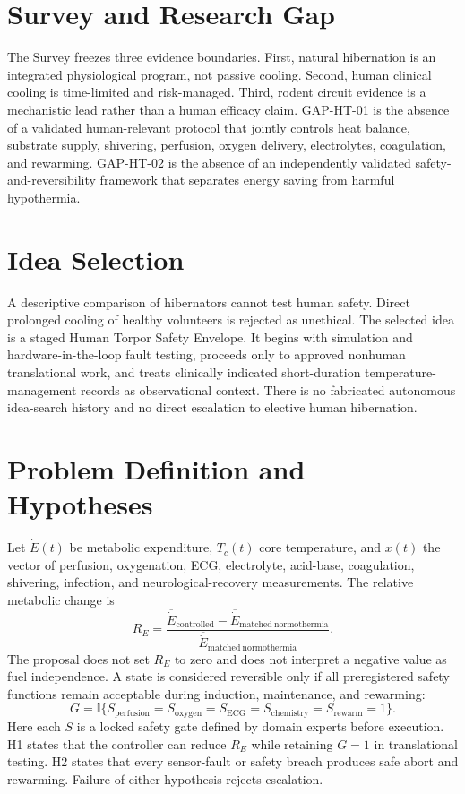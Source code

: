 \documentclass[conference]{IEEEtran}
\newcommand{\indicator}{\mathbb{I}}
\begin{document}
\section{Survey and Research Gap}
The Survey freezes three evidence boundaries. First, natural hibernation is an integrated physiological program, not passive cooling. Second, human clinical cooling is time-limited and risk-managed. Third, rodent circuit evidence is a mechanistic lead rather than a human efficacy claim. GAP-HT-01 is the absence of a validated human-relevant protocol that jointly controls heat balance, substrate supply, shivering, perfusion, oxygen delivery, electrolytes, coagulation, and rewarming. GAP-HT-02 is the absence of an independently validated safety-and-reversibility framework that separates energy saving from harmful hypothermia.
\section{Idea Selection}
A descriptive comparison of hibernators cannot test human safety. Direct prolonged cooling of healthy volunteers is rejected as unethical. The selected idea is a staged Human Torpor Safety Envelope. It begins with simulation and hardware-in-the-loop fault testing, proceeds only to approved nonhuman translational work, and treats clinically indicated short-duration temperature-management records as observational context. There is no fabricated autonomous idea-search history and no direct escalation to elective human hibernation.
\section{Problem Definition and Hypotheses}
Let $\dot{E}(t)$ be metabolic expenditure, $T_c(t)$ core temperature, and $x(t)$ the vector of perfusion, oxygenation, ECG, electrolyte, acid-base, coagulation, shivering, infection, and neurological-recovery measurements. The relative metabolic change is
\begin{equation}\label{eq:metabolic}
R_E=\frac{\overline{\dot{E}}_{\mathrm{controlled}}-\overline{\dot{E}}_{\mathrm{matched\ normothermia}}}{\overline{\dot{E}}_{\mathrm{matched\ normothermia}}}.
\end{equation}
The proposal does not set $R_E$ to zero and does not interpret a negative value as fuel independence. A state is considered reversible only if all preregistered safety functions remain acceptable during induction, maintenance, and rewarming:
\begin{equation}\label{eq:gate}
G=\indicator\{S_{\mathrm{perfusion}}=S_{\mathrm{oxygen}}=S_{\mathrm{ECG}}=S_{\mathrm{chemistry}}=S_{\mathrm{rewarm}}=1\}.
\end{equation}
Here each $S$ is a locked safety gate defined by domain experts before execution. H1 states that the controller can reduce $R_E$ while retaining $G=1$ in translational testing. H2 states that every sensor-fault or safety breach produces safe abort and rewarming. Failure of either hypothesis rejects escalation.
\end{document}
